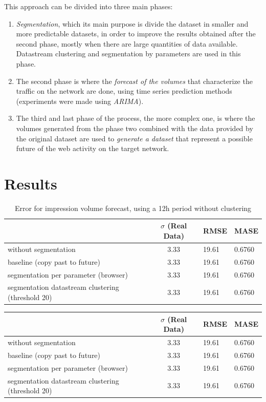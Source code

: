 \documentclass[9pt,a4paper]{extarticle}
\begin{document}
\begin{multicols}{2}
This approach can be divided into three main phases:
\begin{enumerate}
\item \emph{Segmentation},
which its main purpose is divide the dataset in smaller and more predictable
datasets, in order to improve the results obtained after the second phase, mostly when there
are large quantities of data available. Datastream clustering and segmentation
by parameters are used in this phase.

\item The second phase is where the \emph{forecast of the volumes} that characterize the traffic on
  the network are done, using time series prediction methods (experiments were
  made using \emph{ARIMA}).

\item The third and last phase of the process, the more complex one, is where the volumes
generated from the phase two combined with the data provided by the original
dataset are used to \emph{generate a dataset} that represent a possible future of the
web activity on the target network.
\end{enumerate}

\section{Results}

\begin{table}[H]
\centering
\footnotesize
\begin{tabular}{m{2cm}|CMM}
  &  $\sigma$ (Real Data) & RMSE & MASE   \\ \hline
 without segmentation & 3.33      & 19.61        & 0.6760   \\ \hline
  baseline (copy past to future) & 3.33      & 19.61        & 0.6760   \\ \hline
  segmentation per parameter (browser) & 3.33      & 19.61        & 0.6760   \\ \hline
  segmentation datastream clustering (threshold 20) & 3.33      & 19.61        & 0.6760   \\ \hline
\end{tabular}

\caption[Volume
impression forecast error, safari]{Error for impression volume
forecast, using a 12h period without clustering}
\label{tab:noquery}
\end{table}

\begin{table}[H]
\centering
\footnotesize
\begin{tabular}{m{2cm}|CMM}
  &  $\sigma$ (Real Data) & RMSE & MASE   \\ \hline
 without segmentation & 3.33      & 19.61        & 0.6760   \\ \hline
  baseline (copy past to future) & 3.33      & 19.61        & 0.6760   \\ \hline
  segmentation per parameter (browser) & 3.33      & 19.61        & 0.6760   \\ \hline
  segmentation datastream clustering (threshold 20) & 3.33      & 19.61        & 0.6760   \\ \hline
\end{tabular}


\end{table}
\end{multicols}
\end{document}
